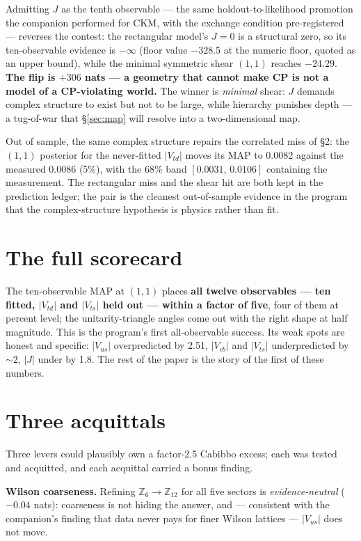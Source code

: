 \documentclass[aps,prd,preprint,nofootinbib]{revtex4-2}
\begin{document}
Admitting $J$ as the tenth observable --- the same holdout-to-likelihood
promotion the companion performed for CKM, with the exchange condition
pre-registered --- reverses the contest: the rectangular model's $J=0$ is a
structural zero, so its ten-observable evidence is $-\infty$ (floor value
$-328.5$ at the numeric floor, quoted as an upper bound), while the minimal
symmetric shear $(1,1)$ reaches $-24.29$. \textbf{The flip is $+306$ nats ---
a geometry that cannot make CP is not a model of a CP-violating world.} The
winner is \emph{minimal} shear: $J$ demands complex structure to exist but not
to be large, while hierarchy punishes depth --- a tug-of-war that
\S\ref{sec:map} will resolve into a two-dimensional map.

Out of sample, the same complex structure repairs the correlated miss of \S2:
the $(1,1)$ posterior for the never-fitted $|V_{td}|$ moves its MAP to 0.0082
against the measured 0.0086 (5\%), with the 68\% band $[0.0031,\,0.0106]$
containing the measurement. The rectangular miss and the shear hit are both
kept in the prediction ledger; the pair is the cleanest out-of-sample evidence
in the program that the complex-structure hypothesis is physics rather than
fit.

\section{The full scorecard}

The ten-observable MAP at $(1,1)$ places \textbf{all twelve observables ---
ten fitted, $|V_{td}|$ and $|V_{ts}|$ held out --- within a factor of five},
four of them at percent level; the unitarity-triangle angles come out with the
right shape at half magnitude. This is the program's first all-observable
success. Its weak spots are honest and specific: $|V_{us}|$ overpredicted by
2.51, $|V_{cb}|$ and $|V_{ts}|$ underpredicted by $\sim 2$, $|J|$ under by 1.8.
The rest of the paper is the story of the first of these numbers.

\section{Three acquittals}

Three levers could plausibly own a factor-2.5 Cabibbo excess; each was tested
and acquitted, and each acquittal carried a bonus finding.

\textbf{Wilson coarseness.} Refining $\mathbb{Z}_6\to\mathbb{Z}_{12}$ for all
five sectors is \emph{evidence-neutral} ($-0.04$ nats): coarseness is not
hiding the answer, and --- consistent with the companion's finding that data
never pays for finer Wilson lattices --- $|V_{us}|$ does not move.
\end{document}
